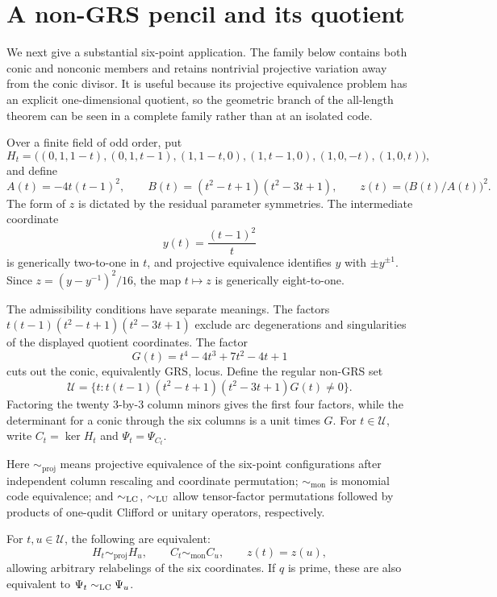 \section{A non-GRS pencil and its quotient}
\label{sec:pencil}

We next give a substantial six-point application.  The family below contains
both conic and nonconic members and retains nontrivial projective variation
away from the conic divisor.  It is useful because its projective equivalence
problem has an explicit one-dimensional quotient, so the geometric branch of
the all-length theorem can be seen in a complete family rather than at an
isolated code.

Over a finite field of odd order, put
\[
H_t=\bigl((0,1,1-t),(0,1,t-1),(1,1-t,0),(1,t-1,0),
          (1,0,-t),(1,0,t)\bigr),
\]
and define
\[
 A(t)=-4t(t-1)^2,\qquad
 B(t)=(t^2-t+1)(t^2-3t+1),\qquad
 z(t)=\bigl(B(t)/A(t)\bigr)^2.
\]
The form of \(z\) is dictated by the residual parameter symmetries.  The
intermediate coordinate
\[
 y(t)=\frac{(t-1)^2}{t}
\]
is generically two-to-one in \(t\), and projective equivalence identifies
\(y\) with \(\pm y^{\pm1}\).  Since
\(z=(y-y^{-1})^2/16\), the map \(t\mapsto z\) is generically eight-to-one.

The admissibility conditions have separate meanings.  The factors
\(t(t-1)(t^2-t+1)(t^2-3t+1)\) exclude arc degenerations and singularities of
the displayed quotient coordinates.  The factor
\[
 G(t)=t^4-4t^3+7t^2-4t+1
\]
cuts out the conic, equivalently GRS, locus.  Define the regular non-GRS set
\begin{equation}\label{eq:regular-pencil-locus}
 \mathcal U=
 \{t:t(t-1)(t^2-t+1)(t^2-3t+1)G(t)\ne0\}.
\end{equation}
Factoring the twenty \(3\)-by-\(3\) column minors gives the first four
factors, while the determinant for a conic through the six columns is a unit
times \(G\).  For \(t\in\mathcal U\), write
\(C_t=\ker H_t\) and \(\Psi_t=\Psi_{C_t}\).

Here \(\sim_{\mathrm{proj}}\) means projective equivalence of the six-point
configurations after independent column rescaling and coordinate permutation;
\(\sim_{\mathrm{mon}}\) is monomial code equivalence; and
\(\sim_{\mathrm{LC}}\), \(\sim_{\mathrm{LU}}\) allow tensor-factor permutations followed by
products of one-qudit Clifford or unitary operators, respectively.

\begin{theorem}
\label{thm:lc-pencil}
For \(t,u\in\mathcal U\), the following are equivalent:
\[
H_t\sim_{\mathrm{proj}}H_u,\qquad
C_t\sim_{\mathrm{mon}}C_u,\qquad z(t)=z(u),
\]
allowing arbitrary relabelings of the six coordinates.  If \(q\) is prime, these are
also equivalent to \(\Psi_t\sim_{\mathrm{LC}}\Psi_u\).
\end{theorem}

